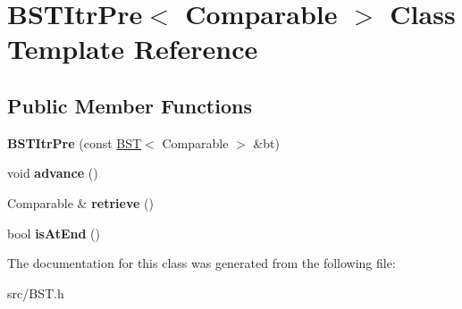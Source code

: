 \hypertarget{singleton_b_s_t_itr_pre}{\section{B\+S\+T\+Itr\+Pre$<$ Comparable $>$ Class Template Reference}
\label{singleton_b_s_t_itr_pre}
}
\subsection*{Public Member Functions}
\begin{DoxyCompactItemize}
\item 
\hypertarget{singleton_b_s_t_itr_pre_a11b1cd4e783f153b9c1b64ce2ec8077e}{{\bfseries B\+S\+T\+Itr\+Pre} (const \hyperlink{singleton_b_s_t}{B\+S\+T}$<$ Comparable $>$ \&bt)}\label{singleton_b_s_t_itr_pre_a11b1cd4e783f153b9c1b64ce2ec8077e}

\item 
\hypertarget{singleton_b_s_t_itr_pre_a7a743d66a842018fd833fb2b0737254d}{void {\bfseries advance} ()}\label{singleton_b_s_t_itr_pre_a7a743d66a842018fd833fb2b0737254d}

\item 
\hypertarget{singleton_b_s_t_itr_pre_af40033e97f63bf025c2e33a9fdce4c43}{Comparable \& {\bfseries retrieve} ()}\label{singleton_b_s_t_itr_pre_af40033e97f63bf025c2e33a9fdce4c43}

\item 
\hypertarget{singleton_b_s_t_itr_pre_ae282a7b9ffa9d250bb0f6a6d79f6e8d0}{bool {\bfseries is\+At\+End} ()}\label{singleton_b_s_t_itr_pre_ae282a7b9ffa9d250bb0f6a6d79f6e8d0}

\end{DoxyCompactItemize}


The documentation for this class was generated from the following file\+:\begin{DoxyCompactItemize}
\item 
src/B\+S\+T.\+h\end{DoxyCompactItemize}
